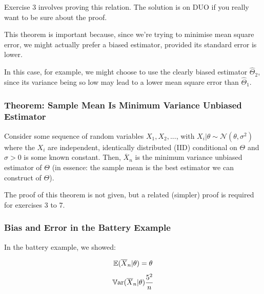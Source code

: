 \documentclass[a4paper]{article}
\begin{document}
                \begin{relq}
                    Exercise 3 involves proving this relation. The solution is
                    on DUO if you really want to be sure about the proof.
                \end{relq}

                This theorem is important because, since we're trying to
                minimise mean square error, we might actually prefer a biased
                estimator, provided its standard error is lower.


                In this case, for example, we might choose to use the clearly
                biased estimator $\widehat\Theta_2$, since its variance being so
                low may lead to a lower mean square error than
                $\widehat\Theta_1$.

            \subsubsection{Theorem: Sample Mean Is Minimum Variance Unbiased
            Estimator}
                Consider some sequence of random variables $X_1, X_2, ...$, with
                $X_i | \theta \sim \mathcal{N}(\theta, \sigma^2)$ where the
                $X_i$ are independent, identically distributed (IID) conditional
                on $\Theta$ and $\sigma > 0$ is some known constant. Then,
                $\overline X_n$ is the minimum variance unbiased estimator of
                $\Theta$ (in essence: the sample mean is the best estimator we
                can construct of $\Theta$).

                \begin{relq}
                    The proof of this theorem is not given, but a related
                    (simpler) proof is required for exercises 3 to 7.
                \end{relq}

            \subsubsection{Bias and Error in the Battery Example}
                In the battery example, we showed:

                \[
                    \mathbb{E}(\overline X_n | \theta) = \theta
                \]
                \[
                    \mathbb{V}\text{ar}(\overline X_n | \theta) \frac{5^2}{n}
                \]
\end{document}

